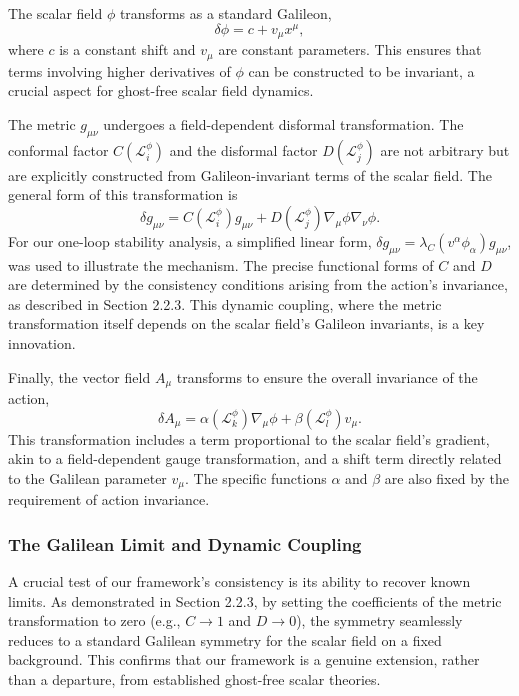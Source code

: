 \documentclass[twocolumn]{aastex631}
\begin{document}
The scalar field $\phi$ transforms as a standard Galileon,
\begin{equation}
\delta \phi = c + v_\mu x^\mu,
\end{equation}
where $c$ is a constant shift and $v_\mu$ are constant parameters. This ensures that terms involving higher derivatives of $\phi$ can be constructed to be invariant, a crucial aspect for ghost-free scalar field dynamics.

The metric $g_{\mu\nu}$ undergoes a field-dependent disformal transformation. The conformal factor $C(\mathcal{L}_i^\phi)$ and the disformal factor $D(\mathcal{L}_j^\phi)$ are not arbitrary but are explicitly constructed from Galileon-invariant terms of the scalar field. The general form of this transformation is
\begin{equation}
\delta g_{\mu\nu} = C(\mathcal{L}_i^\phi) g_{\mu\nu} + D(\mathcal{L}_j^\phi) \nabla_\mu \phi \nabla_\nu \phi.
\end{equation}
For our one-loop stability analysis, a simplified linear form, $\delta g_{\mu\nu} = \lambda_C (v^\alpha \phi_\alpha) g_{\mu\nu}$, was used to illustrate the mechanism. The precise functional forms of $C$ and $D$ are determined by the consistency conditions arising from the action's invariance, as described in Section 2.2.3. This dynamic coupling, where the metric transformation itself depends on the scalar field's Galileon invariants, is a key innovation.

Finally, the vector field $A_\mu$ transforms to ensure the overall invariance of the action,
\begin{equation}
\delta A_\mu = \alpha(\mathcal{L}_k^\phi) \nabla_\mu \phi + \beta(\mathcal{L}_l^\phi) v_\mu.
\end{equation}
This transformation includes a term proportional to the scalar field's gradient, akin to a field-dependent gauge transformation, and a shift term directly related to the Galilean parameter $v_\mu$. The specific functions $\alpha$ and $\beta$ are also fixed by the requirement of action invariance.

\subsubsection{The Galilean Limit and Dynamic Coupling}
A crucial test of our framework's consistency is its ability to recover known limits. As demonstrated in Section 2.2.3, by setting the coefficients of the metric transformation to zero (e.g., $C \to 1$ and $D \to 0$), the symmetry seamlessly reduces to a standard Galilean symmetry for the scalar field on a fixed background. This confirms that our framework is a genuine extension, rather than a departure, from established ghost-free scalar theories.
\end{document}
